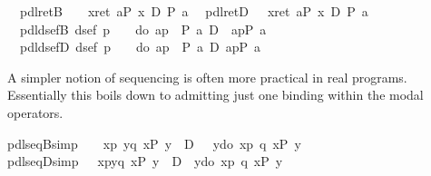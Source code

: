 \begin{isabellebody}
\ \ pdl{\isacharunderscore}retB{\isacharcolon}\ \ {\isachardoublequote}{\isasymturnstile}\ {\isacharbrackleft}{\isacharhash}\ x{\isasymleftarrow}ret\ a{\isacharbrackright}{\isacharparenleft}P\ x{\isacharparenright}\ {\isasymlongleftrightarrow}\isactrlsub D\ P\ a{\isachardoublequote}\isanewline
\ \ pdl{\isacharunderscore}retD{\isacharcolon}\ \ {\isachardoublequote}{\isasymturnstile}\ {\isasymlangle}x{\isasymleftarrow}ret\ a{\isasymrangle}{\isacharparenleft}P\ x{\isacharparenright}\ {\isasymlongleftrightarrow}\isactrlsub D\ P\ a{\isachardoublequote}\isanewline
\ \ pdl{\isacharunderscore}dsefB{\isacharcolon}\ {\isachardoublequote}dsef\ p\ {\isasymLongrightarrow}\ {\isasymturnstile}\ {\isasymUp}\ {\isacharparenleft}do\ {\isacharbraceleft}a{\isasymleftarrow}p{\isacharsemicolon}\ {\isasymDown}\ {\isacharparenleft}P\ a{\isacharparenright}{\isacharbraceright}{\isacharparenright}\ {\isasymlongleftrightarrow}\isactrlsub D\ {\isacharbrackleft}{\isacharhash}\ a{\isasymleftarrow}p{\isacharbrackright}{\isacharparenleft}P\ a{\isacharparenright}{\isachardoublequote}\isanewline
\ \ pdl{\isacharunderscore}dsefD{\isacharcolon}\ {\isachardoublequote}dsef\ p\ {\isasymLongrightarrow}\ {\isasymturnstile}\ {\isasymUp}\ {\isacharparenleft}do\ {\isacharbraceleft}a{\isasymleftarrow}p{\isacharsemicolon}\ {\isasymDown}\ {\isacharparenleft}P\ a{\isacharparenright}{\isacharbraceright}{\isacharparenright}\ {\isasymlongleftrightarrow}\isactrlsub D\ {\isasymlangle}a{\isasymleftarrow}p{\isasymrangle}{\isacharparenleft}P\ a{\isacharparenright}{\isachardoublequote}\isamarkupfalse%
%
\begin{isamarkuptext}%
A simpler notion of sequencing is often more practical in real programs.
  Essentially this boils down to admitting just one binding within the modal
  operators.%
\end{isamarkuptext}%
\isamarkuptrue%
\isanewline
pdl{\isacharunderscore}seqB{\isacharunderscore}simp{\isacharcolon}\ {\isachardoublequote}{\isasymturnstile}\ {\isacharparenleft}\ {\isacharbrackleft}{\isacharhash}\ x{\isasymleftarrow}p{\isacharbrackright}{\isacharbrackleft}{\isacharhash}\ y{\isasymleftarrow}q\ x{\isacharbrackright}{\isacharparenleft}P\ y{\isacharparenright}\ {\isacharparenright}\ {\isasymlongleftrightarrow}\isactrlsub D\ {\isacharparenleft}\ {\isacharbrackleft}{\isacharhash}\ y{\isasymleftarrow}do\ {\isacharbraceleft}x{\isasymleftarrow}p{\isacharsemicolon}\ q\ x{\isacharbraceright}{\isacharbrackright}{\isacharparenleft}P\ y{\isacharparenright}\ {\isacharparenright}{\isachardoublequote}\isanewline
pdl{\isacharunderscore}seqD{\isacharunderscore}simp{\isacharcolon}\ {\isachardoublequote}{\isasymturnstile}\ {\isacharparenleft}\ {\isasymlangle}x{\isasymleftarrow}p{\isasymrangle}{\isasymlangle}y{\isasymleftarrow}q\ x{\isasymrangle}{\isacharparenleft}P\ y{\isacharparenright}\ {\isacharparenright}\ {\isasymlongleftrightarrow}\isactrlsub D\ {\isacharparenleft}\ {\isasymlangle}y{\isasymleftarrow}do\ {\isacharbraceleft}x{\isasymleftarrow}p{\isacharsemicolon}\ q\ x{\isacharbraceright}{\isasymrangle}{\isacharparenleft}P\ y{\isacharparenright}\ {\isacharparenright}{\isachardoublequote}\isamarkupfalse%

\end{isabellebody}
